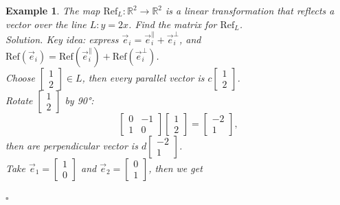 \documentclass[12pt, a4paper]{article}
\newtheorem{eg}{Example}[subsection]
\newenvironment*{sol}{\indent\textit{Solution. }}{\hfill{$\square$}\par}
\def\R{{\mathbb{R}}}
\def\vece{\vec{e}}
\begin{document}
\begin{eg}
The map $\text{Ref}_L:\R^2\rightarrow\R^2$ is a linear transformation that reflects a vector over the line $L: y=2x$. Find the matrix for $\text{Ref}_L$.\\
\begin{sol}
Key idea: express $\vece_i=\vece_i^\parallel+\vece_i^\perp$, and $\text{Ref}(\vece_i)=\text{Ref}(\vece_i^\parallel)+\text{Ref}(\vece_i^\perp)$. \\
Choose $\begin{bmatrix}1\\2\end{bmatrix} \in L$, then every parallel vector is $c\begin{bmatrix}1\\2\end{bmatrix}$.\\
Rotate $\begin{bmatrix}1\\2\end{bmatrix}$ by 90°: $$\begin{bmatrix}0&-1\\1&0\end{bmatrix}\begin{bmatrix}1\\2\end{bmatrix}=\begin{bmatrix}-2\\1\end{bmatrix}, $$
then are perpendicular vector is $d\begin{bmatrix}-2\\1\end{bmatrix}$. \\
Take $\vece_1=\begin{bmatrix}1\\0\end{bmatrix}$ and $\vece_2=\begin{bmatrix}0\\1\end{bmatrix}$, then we get

\end{sol}
\end{eg}
\end{document}
